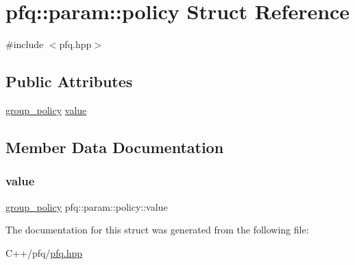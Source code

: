 \hypertarget{structpfq_1_1param_1_1policy}{}\section{pfq\+:\+:param\+:\+:policy Struct Reference}
\label{structpfq_1_1param_1_1policy}


{\ttfamily \#include $<$pfq.\+hpp$>$}

\subsection*{Public Attributes}
\begin{DoxyCompactItemize}
\item 
\hyperlink{namespacepfq_ac41249c8510558905b01fa4d866a38d7}{group\+\_\+policy} \hyperlink{structpfq_1_1param_1_1policy_ab0e84b461546b9e889dbe7b56ae39cdf}{value}
\end{DoxyCompactItemize}


\subsection{Member Data Documentation}
\mbox{\label{structpfq_1_1param_1_1policy_ab0e84b461546b9e889dbe7b56ae39cdf}} 
\subsubsection{\texorpdfstring{value}{value}}
{\footnotesize\ttfamily \hyperlink{namespacepfq_ac41249c8510558905b01fa4d866a38d7}{group\+\_\+policy} pfq\+::param\+::policy\+::value}



The documentation for this struct was generated from the following file\+:\begin{DoxyCompactItemize}
\item 
C++/pfq/\hyperlink{pfq_8hpp}{pfq.\+hpp}\end{DoxyCompactItemize}

